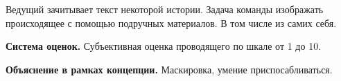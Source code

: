 
\par Ведущий зачитывает текст некоторой истории. Задача команды изображать происходящее с помощью подручных материалов. В том числе из самих себя.

\par \textbf{Система оценок.} Субъективная оценка проводящего по шкале от 1 до 10.

\par \textbf{Объяснение в рамках концепции.} Маскировка, умение приспосабливаться.